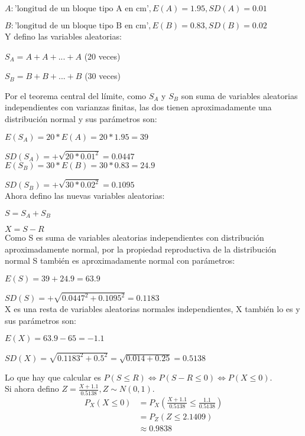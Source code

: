 \documentclass[12pt,fleqn]{article}
\begin{document}
$A: \textrm{'longitud de un bloque tipo A en cm'}, E(A)=1.95, SD(A)=0.01$

$B: \textrm{'longitud de un bloque tipo B en cm'}, E(B)=0.83, SD(B)=0.02$\\

Y defino las variables aleatorias:

$S_A=A+A+...+A$ (20 veces)

$S_B=B+B+...+B$ (30 veces)

Por el teorema central del límite, como $S_A$ y $S_B$ son suma de variables aleatorias independientes con varianzas finitas, las dos tienen aproximadamente una distribución normal y sus parámetros son:

$E(S_A)=20*E(A)=20*1.95=39$

$SD(S_A)=+\sqrt{20*0.01^2}=0.0447$\\

$E(S_B)=30*E(B)=30*0.83=24.9$

$SD(S_B)=+\sqrt{30*0.02^2}=0.1095$\\

Ahora defino las nuevas variables aleatorias:

$S=S_A+S_B$

$X=S-R$\\

Como S es suma de variables aleatorias independientes con distribución aproximadamente normal, por la propiedad reproductiva de la distribución normal S también es aproximadamente normal con parámetros:

$E(S)=39+24.9=63.9$

$SD(S)=+\sqrt{0.0447^2+0.1095^2}=0.1183$\\

X es una resta de variables aleatorias normales independientes, X también lo es y sus parámetros son:

$E(X)=63.9-65=-1.1$

$SD(X)=\sqrt{0.1183^2+0.5^2}=\sqrt{0.014+0.25}=0.5138$

Lo que hay que calcular es $P(S\le R)\iff P(S-R\le 0) \iff P(X\le 0)$.\\

Si ahora defino $Z=\frac{X+1.1}{0.5138}, Z \sim N(0,1)$.
\begin{align*}
  P_X(X\le 0)&=P_X(\frac{X+1.1}{0.5138}\le\frac{1.1}{0.5138})\\
             &=P_Z(Z\le 2.1409)\tag{Por la probabilidad de sucesos equivalentes}\\
             &\approx 0.9838
\end{align*}
\end{document}
